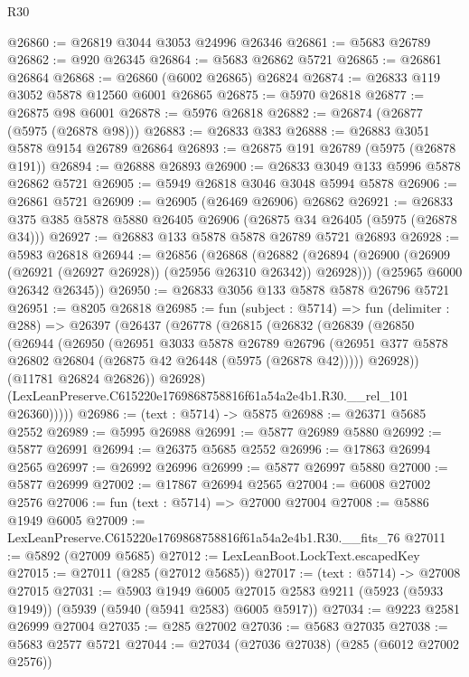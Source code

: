 \begin{lexlean}{R30}
\begin{coremodule}
@26860 := @26819 @3044 @3053 @24996 @26346
@26861 := @5683 @26789
@26862 := @920 @26345
@26864 := @5683 @26862 @5721
@26865 := @26861 @26864
@26868 := @26860 (@6002 @26865) @26824
@26874 := @26833 @119 @3052 @5878 @12560 @6001 @26865
@26875 := @5970 @26818
@26877 := @26875 @98 @6001
@26878 := @5976 @26818
@26882 := @26874 (@26877 (@5975 (@26878 @98)))
@26883 := @26833 @383
@26888 := @26883 @3051 @5878 @9154 @26789 @26864
@26893 := @26875 @191 @26789 (@5975 (@26878 @191))
@26894 := @26888 @26893
@26900 := @26833 @3049 @133 @5996 @5878 @26862 @5721
@26905 := @5949 @26818 @3046 @3048 @5994 @5878
@26906 := @26861 @5721
@26909 := @26905 (@26469 @26906) @26862
@26921 := @26833 @375 @385 @5878 @5880 @26405 @26906 (@26875 @34 @26405 (@5975 (@26878 @34)))
@26927 := @26883 @133 @5878 @5878 @26789 @5721 @26893
@26928 := @5983 @26818
@26944 := @26856
    (@26868
      (@26882 (@26894 (@26900 (@26909 (@26921 (@26927 @26928)) (@25956 @26310 @26342)) @26928)))
      (@25965 @6000 @26342 @26345))
@26950 := @26833 @3056 @133 @5878 @5878 @26796 @5721
@26951 := @8205 @26818
@26985 := fun (subject : @5714) =>
  fun (delimiter : @288) =>
  @26397
    (@26437
      (@26778
        (@26815
          (@26832
            (@26839
              (@26850
                (@26944
                  (@26950
                    (@26951
                      @3033
                      @5878
                      @26789
                      @26796
                      (@26951 @377 @5878 @26802 @26804 (@26875 @42 @26448 (@5975 (@26878 @42)))))
                    @26928))
                (@11781 @26824 @26826))
              @26928)
            (LexLeanPreserve.C615220e1769868758816f61a54a2e4b1.R30.__rel_101 @26360)))))
@26986 := (text : @5714) -> @5875
@26988 := @26371 @5685 @2552
@26989 := @5995 @26988
@26991 := @5877 @26989 @5880
@26992 := @5877 @26991
@26994 := @26375 @5685 @2552
@26996 := @17863 @26994 @2565
@26997 := @26992 @26996
@26999 := @5877 @26997 @5880
@27000 := @5877 @26999
@27002 := @17867 @26994 @2565
@27004 := @6008 @27002 @2576
@27006 := fun (text : @5714) => @27000 @27004
@27008 := @5886 @1949 @6005
@27009 := LexLeanPreserve.C615220e1769868758816f61a54a2e4b1.R30.__fits_76
@27011 := @5892 (@27009 @5685)
@27012 := LexLeanBoot.LockText.escapedKey
@27015 := @27011 (@285 (@27012 @5685))
@27017 := (text : @5714) -> @27008 @27015
@27031 := @5903
    @1949
    @6005
    @27015
    @2583
    @9211
    (@5923 (@5933 @1949))
    (@5939 (@5940 (@5941 @2583) @6005 @5917))
@27034 := @9223 @2581 @26999 @27004
@27035 := @285 @27002
@27036 := @5683 @27035
@27038 := @5683 @2577 @5721
@27044 := @27034 (@27036 @27038) (@285 (@6012 @27002 @2576))

\end{coremodule}
\end{lexlean}
